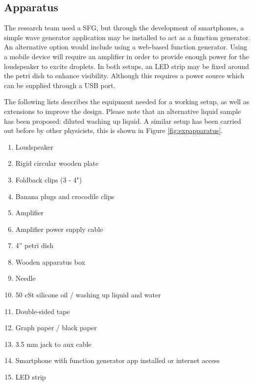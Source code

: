 \subsection{Apparatus}

The research team used a SFG, but through the development of smartphones, a simple wave generator application may be installed to act as a function generator. An alternative option would include using a web-based function generator. Using a mobile device will require an amplifier in order to provide enough power for the loudspeaker to excite droplets. In both setups, an LED strip may be fixed around the petri dish to enhance visibility. Although this requires a power source which can be supplied through a USB port. 

The following lists describes the equipment needed for a working setup, as well as extensions to improve the design. Please note that an alternative liquid sample has been proposed: diluted washing up liquid. A similar setup has been carried out before by other physicists, this is shown in Figure \ref {fig:expapparatus}.

\begin{enumerate}
\item  Loudspeaker

\item  Rigid circular wooden plate

\item  Foldback clips (3 - 4")

\item  Banana plugs and crocodile clips

\item  Amplifier

\item  Amplifier power supply cable

\item  4'' petri dish

\item  Wooden apparatus box

\item  Needle

\item  50 cSt silicone oil / washing up liquid  and water

\item  Double-sided tape

\item  Graph paper / black paper

\item  3.5 mm jack to aux cable

\item  Smartphone with function generator app installed or internet access

\item  LED strip

\end{enumerate}

